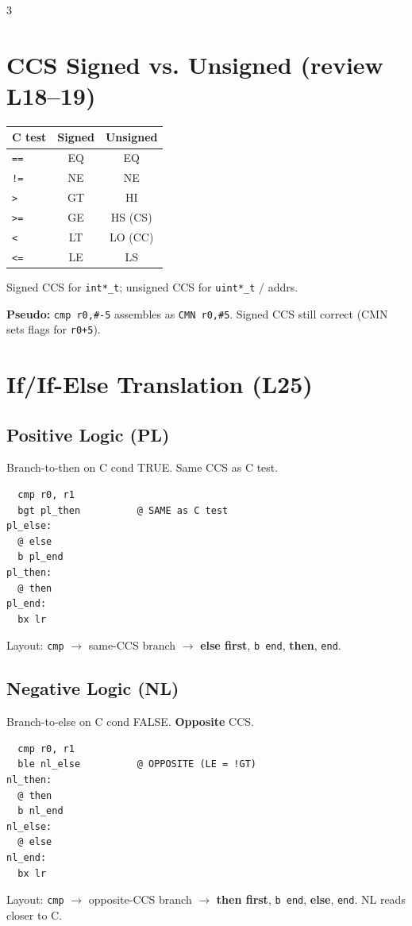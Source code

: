 \documentclass[8pt,landscape]{extarticle}
\newcommand{\asm}[1]{\texttt{\scriptsize #1}}
\newcommand{\cee}[1]{\texttt{\scriptsize #1}}
\begin{document}
\begin{multicols*}{3}
\section{CCS Signed vs. Unsigned (review L18--19)}
\begin{tabular}{@{}lcc@{}}
\toprule
C test & Signed & Unsigned \\
\midrule
\cee{==} & EQ & EQ \\
\cee{!=} & NE & NE \\
\cee{>}  & GT & HI \\
\cee{>=} & GE & HS (CS) \\
\cee{<}  & LT & LO (CC) \\
\cee{<=} & LE & LS \\
\bottomrule
\end{tabular}

Signed CCS for \cee{int*\_t}; unsigned CCS for \cee{uint*\_t} / addrs.

\textbf{Pseudo:} \asm{cmp r0,\#-5} assembles as \asm{CMN r0,\#5}. Signed CCS still correct (CMN sets flags for \texttt{r0+5}).

\section{If/If-Else Translation (L25)}

\subsection{Positive Logic (PL)}
Branch-to-then on C cond TRUE. Same CCS as C test.
\begin{lstlisting}
  cmp r0, r1
  bgt pl_then          @ SAME as C test
pl_else:
  @ else
  b pl_end
pl_then:
  @ then
pl_end:
  bx lr
\end{lstlisting}
Layout: \asm{cmp} $\to$ same-CCS branch $\to$ \textbf{else first}, \asm{b end}, \textbf{then}, \texttt{end}.

\subsection{Negative Logic (NL)}
Branch-to-else on C cond FALSE. \textbf{Opposite} CCS.
\begin{lstlisting}
  cmp r0, r1
  ble nl_else          @ OPPOSITE (LE = !GT)
nl_then:
  @ then
  b nl_end
nl_else:
  @ else
nl_end:
  bx lr
\end{lstlisting}
Layout: \asm{cmp} $\to$ opposite-CCS branch $\to$ \textbf{then first}, \asm{b end}, \textbf{else}, \texttt{end}. NL reads closer to C.


\end{multicols*}
\end{document}
